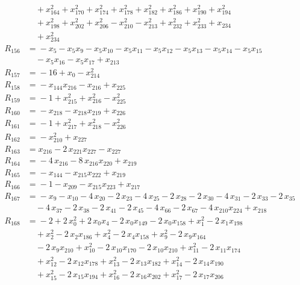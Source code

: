\begin{align*}
&\quad{} +x_{164}^{2} +x_{170}^{2} +x_{174}^{2} +x_{178}^{2} +x_{182}^{2} +x_{186}^{2} +x_{190}^{2} +x_{194}^{2} \\
&\quad{} +x_{198}^{2} +x_{202}^{2} +x_{206}^{2} -x_{210}^{2} -x_{213}^{2} +x_{232}^{2} +x_{233}^{2} +x_{234} \\
&\quad{} +x_{234}^{2} \\[2pt]
R_{156} &={} -x_{5} -x_{5} x_{9} -x_{5} x_{10} -x_{5} x_{11} -x_{5} x_{12} -x_{5} x_{13} -x_{5} x_{14} -x_{5} x_{15} \\
&\quad{} -x_{5} x_{16} -x_{5} x_{17} +x_{213} \\[2pt]
R_{157} &={} -16 +x_{0} -x_{214}^{2} \\[2pt]
R_{158} &={} -x_{144} x_{216} -x_{216} +x_{225} \\[2pt]
R_{159} &={} -1 +x_{215}^{2} +x_{216}^{2} -x_{225}^{2} \\[2pt]
R_{160} &={} -x_{218} -x_{218} x_{219} +x_{226} \\[2pt]
R_{161} &={} -1 +x_{217}^{2} +x_{218}^{2} -x_{226}^{2} \\[2pt]
R_{162} &={} -x_{210}^{2} +x_{227} \\[2pt]
R_{163} &={} x_{216} -2\,x_{221} x_{227} -x_{227} \\[2pt]
R_{164} &={} -4\,x_{216} -8\,x_{216} x_{220} +x_{219} \\[2pt]
R_{165} &={} -x_{144} -x_{215} x_{222} +x_{219} \\[2pt]
R_{166} &={} -1 -x_{209} -x_{215} x_{223} +x_{217} \\[2pt]
R_{167} &={} -x_{9} -x_{10} -4\,x_{20} -2\,x_{23} -4\,x_{25} -2\,x_{28} -2\,x_{30} -4\,x_{31} -2\,x_{33} -2\,x_{35} \\
&\quad{} -4\,x_{37} -2\,x_{38} -2\,x_{41} -2\,x_{45} -4\,x_{66} -2\,x_{67} -4\,x_{210} x_{224} +x_{218} \\[2pt]
R_{168} &={} -2 +2\,x_{0}^{2} +2\,x_{0} x_{4} -2\,x_{0} x_{149} -2\,x_{0} x_{158} +x_{1}^{2} -2\,x_{1} x_{198} \\
&\quad{} +x_{2}^{2} -2\,x_{2} x_{186} +x_{4}^{2} -2\,x_{4} x_{158} +x_{9}^{2} -2\,x_{9} x_{164} \\
&\quad{} -2\,x_{9} x_{210} +x_{10}^{2} -2\,x_{10} x_{170} -2\,x_{10} x_{210} +x_{11}^{2} -2\,x_{11} x_{174} \\
&\quad{} +x_{12}^{2} -2\,x_{12} x_{178} +x_{13}^{2} -2\,x_{13} x_{182} +x_{14}^{2} -2\,x_{14} x_{190} \\
&\quad{} +x_{15}^{2} -2\,x_{15} x_{194} +x_{16}^{2} -2\,x_{16} x_{202} +x_{17}^{2} -2\,x_{17} x_{206} \\

\end{align*}
